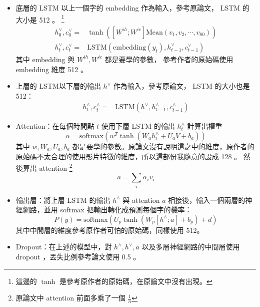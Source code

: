 \documentclass[fleqn,a4paper,12pt]{article}
\begin{document}
\begin{itemize}
\item 底層的 LSTM 以上一個字的 embedding 作為輸入，參考原論文， LSTM 的大小是 512 。 \footnote{這邊的 $\tanh$ 是參考原作者的原始碼，在原論文中沒有出現。}
  \begin{equation}
    \begin{aligned}
      h^\vee_0, c^\vee_0 =& \tanh([W^{ih}; W^{ic}] \mathrm{Mean}({v_1, v_2, \cdots, v_{80}})) \\
      h^\vee_t, c^\vee_t =& \mathrm{LSTM}(\mathrm{embedding}(y_t), h^\vee_{t-1}, c^\vee_{t-1})
    \end{aligned}
  \end{equation}
  其中 embedding 與 $W^{ih}, W^{ic}$ 都是要學的參數， 參考作者的原始碼使用 embedding 維度 512 。
  
\item 上層的 LSTM以下層的輸出 $h^\vee$ 作為輸入，參考原論文， LSTM 的大小也是 512：
  \begin{equation}
    \begin{aligned}
      h^\wedge_t, c^\wedge_t =& \mathrm{LSTM}(h^\vee, h^\wedge_{t-1}, c^\wedge_{t-1})      
    \end{aligned}
  \end{equation}
  
\item \label{attention} Attention：在每個時間點 $t$ 使用下層 LSTM 的輸出 $h_t^\wedge$ 計算出權重
  \begin{equation}
    \alpha = \mathrm{softmax}(w^T \tanh(W_a h^\wedge_t + U_a V + b_a))
  \end{equation}
  其中 $w, W_a, U_a, b_a$ 都是要學的參數。原論文沒有說明這之中的維度，原作者的原始碼不太合理的使用影片特徵的維度，所以這部份我隨意的設成 128 。
  然後算出 attention \footnote{原論文中 attention 前面多乘了一個 $\frac{1}{n}$} 
  \begin{equation}
    a = \sum_i \alpha_i v_i 
  \end{equation}
  
\item 輸出層：將上層 LSTM 的輸出 $h^\wedge$ 與 attention $a$ 相接後，輸入一個兩層的神經網路，並用 softmax 把輸出轉化成預測每個字的機率：
  \begin{equation}
    P(y) = \mathrm{softmax}(U_p \tanh(W_p[h^\wedge; a] + b_p) + d)
  \end{equation}
  其中中間層的維度參考原作者可怕的原始碼，同樣使用 512。
\item Dropout：在上述的模型中，對 $h^\wedge, h^\vee, a$ 以及多層神經網路的中間層使用 dropout ，丟失比例參考論文使用 0.5 。

\end{itemize}
\end{document}
